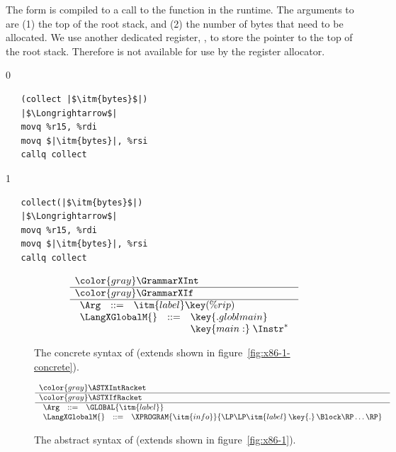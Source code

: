 \documentclass[7x10]{TimesAPriori_MIT}%
\newcommand{\gray}[1]{{\color{gray} #1}}
\def\racketEd{0}
\def\pythonEd{1}
\def\edition{1}
\newcommand{\pythonColor}[0]{}
\numberwithin{theorem}{chapter}
\numberwithin{definition}{chapter}
\numberwithin{equation}{chapter}
\begin{document}
%
The  form is compiled to a call to the 
function in the runtime. The arguments to  are (1) the
top of the root stack, and (2) the number of bytes that need to be
allocated.  We use another dedicated register, , to store
the pointer to the top of the root stack. Therefore  is not
available for use by the register allocator.
%
{\if\edition\racketEd
\begin{lstlisting}
   (collect |$\itm{bytes}$|)
   |$\Longrightarrow$|
   movq %r15, %rdi
   movq $|\itm{bytes}|, %rsi
   callq collect
\end{lstlisting}
\fi}
{\if\edition\pythonEd\pythonColor    
\begin{lstlisting}
   collect(|$\itm{bytes}$|)
   |$\Longrightarrow$|
   movq %r15, %rdi
   movq $|\itm{bytes}|, %rsi
   callq collect
\end{lstlisting}
\fi}


\newcommand{\GrammarXGlobal}{
\begin{array}{lcl}
  \Arg &::=& \itm{label} \key{(\%rip)} 
\end{array}
}

\newcommand{\ASTXGlobalRacket}{
\begin{array}{lcl}
  \Arg &::=&  \GLOBAL{\itm{label}} 
\end{array}
}


\begin{figure}[tp]
  \begin{tcolorbox}[colback=white]
\[
\begin{array}{l}
  \gray{\GrammarXInt} \\ \hline
  \gray{\GrammarXIf} \\ \hline
  \GrammarXGlobal \\
\begin{array}{lcl}
\LangXGlobalM{} &::= &  \key{.globl main} \\
      &    &  \key{main:} \; \Instr^{*} 
\end{array}
\end{array}
\]
  \end{tcolorbox}
\caption{The concrete syntax of \LangXGlobal{}  (extends \LangXIf{} shown in figure~\ref{fig:x86-1-concrete}).}
\label{fig:x86-2-concrete}
\end{figure}

\begin{figure}[tp]
\begin{tcolorbox}[colback=white]
    \small
\[
\begin{array}{l}
  \gray{\ASTXIntRacket} \\ \hline
  \gray{\ASTXIfRacket} \\ \hline
  \ASTXGlobalRacket \\
\begin{array}{lcl}
\LangXGlobalM{} &::= & \XPROGRAM{\itm{info}}{\LP\LP\itm{label} \,\key{.}\, \Block \RP\ldots\RP}
\end{array}
\end{array}
\]
\end{tcolorbox}

\caption{The abstract syntax of \LangXGlobal{} (extends \LangXIf{} shown in figure~\ref{fig:x86-1}).}
\label{fig:x86-2}
\end{figure}
\end{document}
